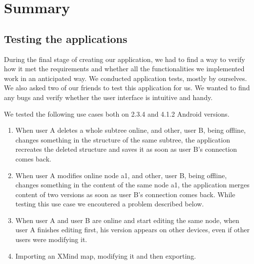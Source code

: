 %
%
%
%
%

\chapter{Summary}
\label{chap:summary}

\section{Testing the applications}
\label{sec:summary-testing}
During the final stage of creating our application, we had to find a way to verify how it met the requirements and whether all the functionalities we implemented work in an anticipated way. We conducted application tests, mostly by ourselves. We also asked two of our friends to test this application for us. We wanted to find any bugs and verify whether the user interface is intuitive and handy. 

We tested the following use cases both on 2.3.4 and 4.1.2 Android versions.

\begin{enumerate}
	\item When user A deletes a whole subtree online, and other, user B, being offline, changes something in the structure of the same subtree, the application recreates the deleted structure and saves it as soon as user B's connection comes back.
	
	\item When user A modifies online node a1, and other, user B, being offline, changes something in the content of the same node a1, the application merges content of two versions as soon as user B's connection comes back. 
	While testing this use case we encoutered a problem described below.
	
	\item When user A and user B are online and start editing the same node, when user A finishes  editing first, his version appears on other devices, even if other users were modifying it.
	
	\item Importing an XMind map, modifying it and then exporting.
\end{enumerate}

